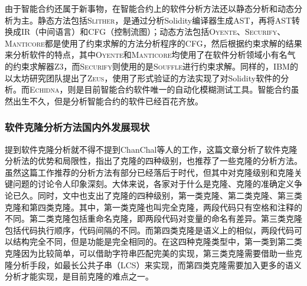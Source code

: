 由于智能合约还属于新事物，在智能合约上的软件分析方法还以静态分析和动态分析为主。静态方法包括\textsc{Slither}\cite{slither}，是通过分析Solidity编译器生成AST，再将AST转换成IR（中间语言）和CFG（控制流图）；动态方法包括\textsc{Oyente}\cite{oyente}、\textsc{Securify}\cite{securify}、\textsc{Manticore}\cite{manticore}都是使用了约束求解的方法分析程序的CFG，然后根据约束求解的结果来分析软件的特点，其中\textsc{Oyente}和\textsc{Manticore}均使用了在软件分析领域小有名气的约束求解器Z3\cite{z3}，而\textsc{Securify}则使用的是\textsc{Souffle}\cite{souffle}进行约束求解。同样的，IBM的以太坊研究团队提出了\textsc{Zeus}\cite{zeus}，使用了形式验证的方法实现了对Solidity软件的分析。而\textsc{Echidna}\cite{echidna}，则是目前智能合约软件唯一的自动化模糊测试工具。智能合约虽然出生不久，但是分析智能合约的软件已经百花齐放。

%

\subsubsection{软件克隆分析方法国内外发展现状}\label{sec:clone_intro}
提到软件克隆分析就不得不提到ChanChal等人的工作\cite{survey-on-clone}，这篇文章分析了软件克隆分析法的优势和局限性，指出了克隆的四种级别，也推荐了一些克隆的分析方法。虽然这篇工作推荐的分析方法有部分已经落后于时代，但其中对克隆级别和克隆关键问题的讨论令人印象深刻。大体来说，各家对于什么是克隆、克隆的准确定义争论已久。同时，文中也支出了克隆的四种级别，第一类克隆、第二类克隆、第三类克隆和第四类克隆。其中，第一类克隆也叫完全克隆，两段代码只有空格和注释的不同。第二类克隆包括重命名克隆，即两段代码对变量的命名有差异。第三类克隆包括代码执行顺序，代码间隔的不同。而第四类克隆是语义上的相似，两段代码可以结构完全不同，但是功能是完全相同的。在这四种克隆类型中，第一类到第二类克隆因为比较简单，可以借助字符串匹配完美的实现，第三类克隆需要借助一些克隆分析手段，如最长公共子串（LCS）来实现，而第四类克隆需要加入更多的语义分析才能实现，是目前克隆的难点之一。

